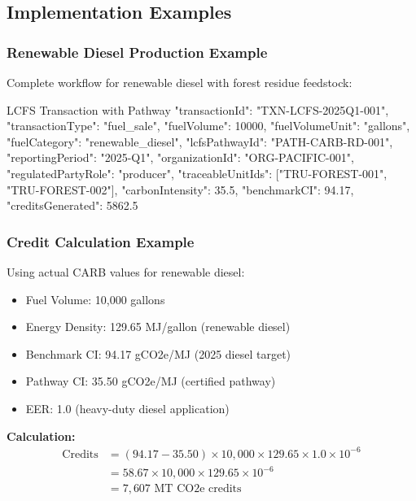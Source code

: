 \subsection{Implementation Examples}
\label{sec:lcfs-examples}

\subsubsection{Renewable Diesel Production Example}

Complete workflow for renewable diesel with forest residue feedstock:

\begin{jsonexample}{LCFS Transaction with Pathway}
{
  "transactionId": "TXN-LCFS-2025Q1-001",
  "transactionType": "fuel_sale",
  "fuelVolume": 10000,
  "fuelVolumeUnit": "gallons",
  "fuelCategory": "renewable_diesel",
  "lcfsPathwayId": "PATH-CARB-RD-001",
  "reportingPeriod": "2025-Q1",
  "organizationId": "ORG-PACIFIC-001",
  "regulatedPartyRole": "producer",
  "traceableUnitIds": ["TRU-FOREST-001", "TRU-FOREST-002"],
  "carbonIntensity": 35.5,
  "benchmarkCI": 94.17,
  "creditsGenerated": 5862.5
}
\end{jsonexample}

\subsubsection{Credit Calculation Example}

Using actual CARB values for renewable diesel:

\begin{itemize}
    \item Fuel Volume: 10,000 gallons
    \item Energy Density: 129.65 MJ/gallon (renewable diesel)
    \item Benchmark CI: 94.17 gCO2e/MJ (2025 diesel target)
    \item Pathway CI: 35.50 gCO2e/MJ (certified pathway)
    \item EER: 1.0 (heavy-duty diesel application)
\end{itemize}

\textbf{Calculation:}
\begin{align}
\text{Credits} &= (94.17 - 35.50) \times 10,000 \times 129.65 \times 1.0 \times 10^{-6} \\
&= 58.67 \times 10,000 \times 129.65 \times 10^{-6} \\
&= 7,607 \text{ MT CO2e credits}
\end{align}

